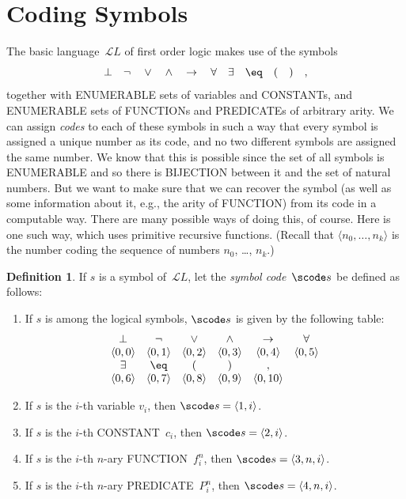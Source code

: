 \documentclass[10pt,a4paper]{article}
\newcommand*{\olup}[1]{\MakeUppercase{#1}}
\theoremstyle{plain}
\theoremstyle{definition}
\newtheorem{defn}[thm]{Definition}
\theoremstyle{remark}
\newcommand*{\olfileid}[3]{}
\newcommand*{\olsection}[1]{\section*{#1}}
\providecommand{\lif}{\mathbin{\rightarrow}}
\providecommand{\lforall}{\mathord{\forall}}
\providecommand{\lexists}{\mathord{\exists}}
\providecommand{\lfalse}{\bot}
\providecommand{\Obj}{}
\providecommand{\Lang}{\ensuremath{\mathcal{L}}}
\providecommand{\tuple}[1]{\langle #1 \rangle}
\begin{document}



\olfileid{inc}{art}{cod}
\olsection{Coding Symbols}

The basic language~$\Lang L$ of first order logic makes use of the symbols
\[
\lfalse \quad \lnot \quad \lor \quad \land \quad \lif \quad \lforall
\quad \lexists \quad \eq \quad ( \quad ) \quad ,
\]
together with \olup{enumerable} sets of variables and \olup{constant}s, and
\olup{enumerable} sets of \olup{function}s and \olup{predicate}s of arbitrary
arity.  We can assign \emph{codes} to each of these symbols in such a
way that every symbol is assigned a unique number as its code, and no
two different symbols are assigned the same number.  We know that this
is possible since the set of all symbols is \olup{enumerable} and so
there is \olup{bijection} between it and the set of natural numbers.
But we want to make sure that we can recover the symbol (as well as
some information about it, e.g., the arity of \olup{function}) from its
code in a computable way.  There are many possible ways of doing this,
of course.  Here is one such way, which uses primitive recursive
functions.  (Recall that $\tuple{n_0, \dots, n_k}$ is the number
coding the sequence of numbers $n_0$, \dots, $n_k$.)

\begin{defn}
If $s$ is a symbol of~$\Lang L$, let the \emph{symbol code}~$\scode s$ be
defined as follows:
\begin{enumerate}
\item If $s$ is among the logical symbols, $\scode s$ is given by the
  following table:
\[
\begin{array}{cccccccccc}
  \lfalse & \lnot & \lor & \land & \lif & \lforall \\
\tuple{0, 0} & \tuple{0, 1} & \tuple{0, 2} & \tuple{0, 3} &
\tuple{0, 4} & \tuple{0, 5} \\
\lexists & \eq & ( & ) & ,\\
\tuple{0, 6} & \tuple{0, 7} &
\tuple{0, 8} & \tuple{0, 9} & \tuple{0, 10}
\end{array}
\]
\item If $s$ is the $i$-th variable $\Obj v_i$, then $\scode s = \tuple{1, i}$.
\item If $s$ is the $i$-th \olup{constant}~$\Obj c_i$, then
  $\scode s = \tuple{2, i}$.
\item If $s$ is the $i$-th $n$-ary \olup{function}~$\Obj f_i^n$, then
  $\scode s = \tuple{3, n, i}$.
\item If $s$ is the $i$-th $n$-ary \olup{predicate}~$\Obj P_i^n$, then
  $\scode s = \tuple{4, n, i}$.
\end{enumerate}
\end{defn}
\end{document}

